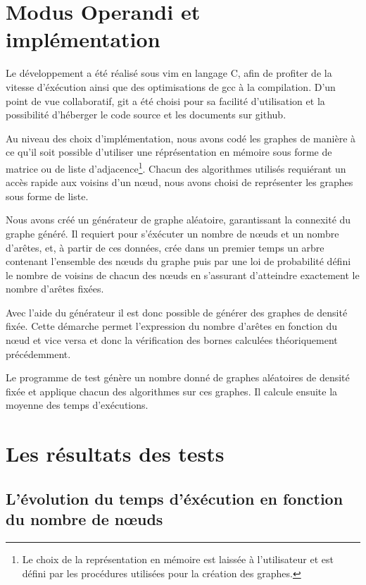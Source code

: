\section{Modus Operandi et implémentation}

Le développement a été réalisé sous vim en langage C, afin de profiter de la vitesse d'éxécution
ainsi que des optimisations de gcc à la compilation. D'un point de vue collaboratif, git a été
choisi pour sa facilité d'utilisation et la possibilité d'héberger le code source et les documents
sur github.

Au niveau des choix d'implémentation, nous avons codé les graphes de manière à ce qu'il soit
possible d'utiliser une réprésentation en mémoire sous forme de matrice ou de liste
d'adjacence\footnote{Le choix de la représentation en mémoire est laissée à l'utilisateur et est
défini par les procédures utilisées pour la création des graphes.}. Chacun des algorithmes utilisés
requiérant un accès rapide aux voisins d'un n\oe ud, nous avons choisi de représenter les graphes sous
forme de liste.

Nous avons créé un générateur de graphe aléatoire, garantissant la connexité du graphe généré. Il
requiert pour s'éxécuter un nombre de n\oe uds et un nombre d'arêtes, et, à partir de ces
données, crée dans un premier temps un arbre contenant l'ensemble des n\oe uds du graphe puis par
une loi de probabilité défini le nombre de voisins de chacun des n\oe uds en s'assurant d'atteindre
exactement le nombre d'arêtes fixées.

Avec l'aide du générateur il est donc possible de générer des graphes de densité fixée. Cette
démarche permet l'expression du nombre d'arêtes en fonction du n\oe ud et vice versa et donc la
vérification des bornes calculées théoriquement précédemment.

Le programme de test génère un nombre donné de graphes aléatoires de densité fixée et applique
chacun des algorithmes sur ces graphes. Il calcule ensuite la moyenne des temps d'exécutions.

\section{Les résultats des tests}

\subsection{L'évolution du temps d'éxécution en fonction du nombre de n\oe uds}

